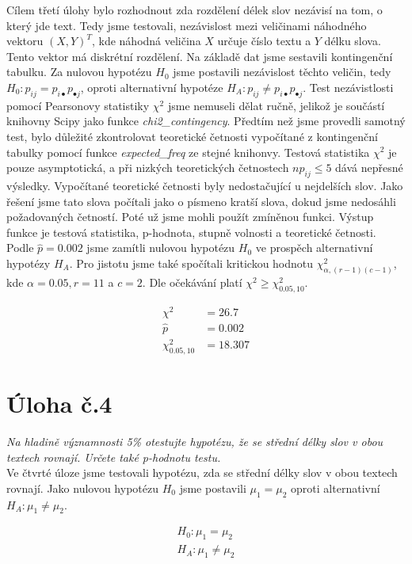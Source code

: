 \documentclass[czech]{mvi-report}
\begin{document}
Cílem třetí úlohy bylo rozhodnout zda rozdělení délek slov nezávisí na tom, o který jde text. Tedy jsme testovali, nezávislost mezi veličinami náhodného vektoru $ (X,Y)^T $, kde náhodná veličina $ X $ určuje číslo textu a $ Y $ délku slova. Tento vektor má diskrétní rozdělení. Na základě dat jsme sestavili kontingenční tabulku. Za nulovou hypotézu $ H_0 $ jsme postavili nezávislost těchto veličin, tedy $ H_0: p_{ij}=p_{i \bullet} p_{\bullet j} $, oproti alternativní hypotéze $ H_A: p_{ij}\neq p_{i \bullet} p_{\bullet j} $. Test nezávistlosti pomocí Pearsonovy statistiky $ \chi^2 $ jsme nemuseli dělat ručně, jelikož je součástí knihovny Scipy jako funkce \textit{chi2\_contingency}. Předtím než jsme provedli samotný test, bylo důležité zkontrolovat teoretické četnosti vypočítané z kontingenční tabulky pomocí funkce \textit{expected\_freq} ze stejné knihonvy. Testová statistika $ \chi^2 $ je pouze asymptotická, a při nizkých teoretických četnostech $ np_{ij} \leq 5 $ dává nepřesné výsledky. Vypočítané teoretické četnosti byly nedostačující u nejdelších slov. Jako řešení jsme tato slova počítali jako o písmeno kratší slova, dokud jsme nedosáhli požadovaných četností. Poté už jsme mohli použít zmíněnou funkci. Výstup funkce je testová statistika, p-hodnota, stupně volnosti a teoretické četnosti. Podle $ \hat{p} = 0.002 $ jsme zamítli nulovou hypotézu $ H_0 $ ve prospěch alternativní hypotézy $ H_A $. Pro jistotu jsme také spočítali kritickou hodnotu $ \chi^2_{\alpha,(r-1)(c-1)} $, kde $ \alpha = 0.05, r = 11 $ a $ c = 2 $. Dle očekávání platí $ \chi^2 \geq \chi^2_{0.05,10} $.

\begin{align*}
\chi^2 &= 26.7\\
\hat{p} &= 0.002\\
\chi^2_{0.05,10} &= 18.307
\end{align*}

\section{Úloha č.4}
\textit{Na hladině významnosti 5\% otestujte hypotézu, že se střední délky slov v obou textech rovnají. Určete také p-hodnotu testu.}\\

Ve čtvrté úloze jsme testovali hypotézu, zda se střední délky slov v obou textech rovnají. Jako nulovou hypotézu $ H_0 $ jsme postavili $ \mu_1 = \mu_2 $ oproti alternativní $ H_A: \mu_1 \neq \mu_2 $. 

\begin{align*}
H_0: \mu_1 = \mu_2\\
H_A: \mu_1 \neq \mu_2
\end{align*}
\end{document}
